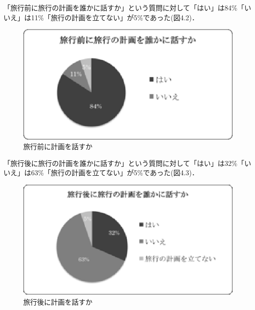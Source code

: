 \documentclass{funthesis}
\begin{document}
「旅行前に旅行の計画を誰かに話すか」という質問に対して「はい」は84\%「いいえ」は11\%「旅行の計画を立てない」が5\%であった(図4.2)．\\
\begin{figure}[htpb]
\begin{center}
\includegraphics[scale=1.0]{beforetalktrip.eps}
\caption{旅行前に計画を話すか}
\end{center}
\end{figure}

「旅行後に旅行の計画を誰かに話すか」という質問に対して「はい」は32\%「いいえ」は63\%「旅行の計画を立てない」が5\%であった(図4.3)．\\
\begin{figure}[htpb]
\begin{center}
\includegraphics[scale=1.0]{aftertalktrip.eps}
\caption{旅行後に計画を話すか}
\end{center}
\end{figure}
\end{document}
